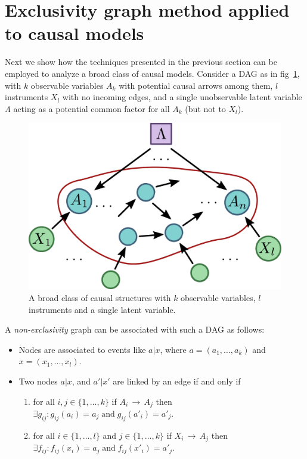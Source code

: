\documentclass[letterpaper]{article}
\newcommand{\et}{\;\mathrm{and}\;}
\begin{document}
\section{Exclusivity graph method applied to causal models}
Next we show how the techniques presented in the previous section can be employed to analyze
a broad class of causal models. Consider a DAG as in fig~\ref{fig:onelambda}, with
$k$ observable variables $A_k$ with potential causal arrows among them, $l$ instruments $X_l$ with no incoming edges, and a single unobservable latent variable $\Lambda$ acting as a potential common factor for all $A_k$ (but not to $X_l$).

\begin{figure}[h]
    \centering
    \includegraphics[width=.9\columnwidth]{images/onelambda.pdf}
    \caption{A broad class of causal structures with $k$ observable variables, $l$ instruments and a single latent     variable.}
    \label{fig:onelambda}
\end{figure}

A \emph{non-exclusivity} graph can be associated with such a DAG
as follows:
\begin{itemize}
    \item Nodes are associated to events like $a | x$, where $a = (a_1,\ldots,a_k)$ and  $x = (x_1,\ldots,x_l)$.
    \item Two nodes $a | x$, and $a' | x'$ are linked by an edge if and only if 
        \begin{enumerate}
            \item for all $i,j \in \{1,\ldots,k\}$ if $A_i\,
                \rightarrow\, A_j$ then $\exists g_{ij} : g_{ij}(a_i) = a_j
                \et g_{ij}(a'_i) = a'_j$.
            \item for all $i\in \{1,\ldots,l\}$ and $j\in \{1,\ldots,k\}$ if
                $X_i\,\rightarrow\,A_j$ then $\exists f_{ij} : f_{ij}(x_i) = a_j
                \et f_{ij}(x'_i) = a'_j$.
        \end{enumerate}
\end{itemize}
\end{document}
